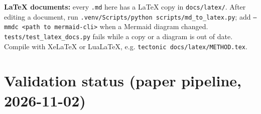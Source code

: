 \documentclass[10pt,a4paper]{article}
\begin{document}
\textbf{LaTeX documents:} every \texttt{.\allowbreak{}md} here has a LaTeX copy in \texttt{docs/\allowbreak{}latex/\allowbreak{}}. After editing a document, run \texttt{.\allowbreak{}venv/\allowbreak{}Scripts/\allowbreak{}python scripts/\allowbreak{}md\_\allowbreak{}to\_\allowbreak{}latex.\allowbreak{}py}; add \texttt{--mmdc <path to mermaid-cli>} when a Mermaid diagram changed. \texttt{tests/\allowbreak{}test\_\allowbreak{}latex\_\allowbreak{}docs.\allowbreak{}py} fails while a copy or a diagram is out of date. Compile with XeLaTeX or LuaLaTeX, e.g. \texttt{tectonic docs/\allowbreak{}latex/\allowbreak{}METHOD.\allowbreak{}tex}.

\section*{Validation status (paper pipeline, 2026-11-02)}
\end{document}
